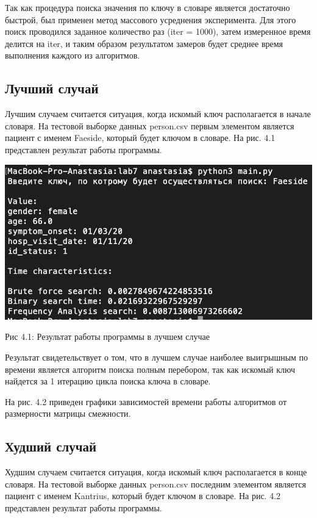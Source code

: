 \documentclass[12pt]{report}
\begin{document}
Так как процедура поиска значения по ключу в словаре является достаточно быстрой, был применен метод массового усреднения эксперимента. Для этого поиск проводился заданное количество раз (iter = 1000), затем измеренное время делится на iter, и таким образом результатом замеров будет среднее время выполнения каждого из алгоритмов.

\subsection{Лучший случай}
Лучшим случаем считается ситуация, когда искомый ключ располагается в начале словаря. На тестовой выборке данных person.csv первым элементом является пациент с именем Faeside, который будет ключом в словаре. На рис. 4.1 представлен результат работы программы.

\begin{center}
		\includegraphics[scale=0.7]{pics/Best.png}
		
			Рис 4.1: Результат работы программы в лучшем случае
\end{center}

Результат свидетельствует о том, что в лучшем случае наиболее выигрышным по времени является алгоритм поиска полным перебором, так как искомый ключ найдется за 1 итерацию цикла поиска ключа в словаре.

На рис. 4.2 приведен графики зависимостей времени работы алгоритмов от размерности матрицы смежности.


\subsection{Худший случай}

Худшим случаем считается ситуация, когда искомый ключ располагается в конце словаря. На тестовой выборке данных person.csv последним элементом является пациент с именем Kantrius, который будет ключом в словаре. На рис. 4.2 представлен результат работы программы.
\end{document}
